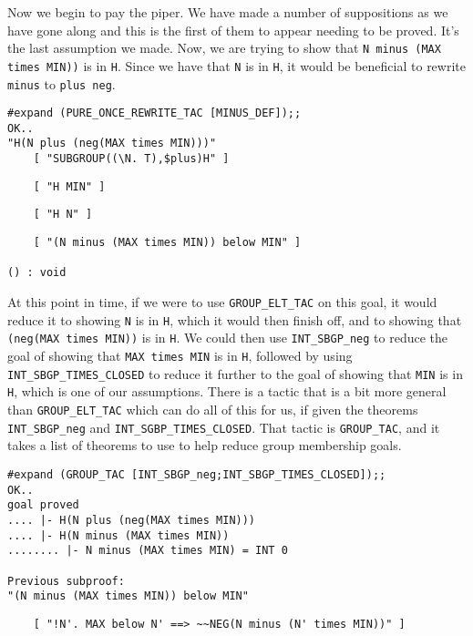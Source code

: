 Now we begin to pay the piper.  We have made a number of suppositions
as we have gone along and this is the first of them to appear needing
to be proved.  It's the last assumption we made.  Now, we are trying
to show that {\small\verb+N minus (MAX times MIN))+} is in {\small\tt H}.
Since we have that {\small\tt N} is in {\small\tt H}, it would be
beneficial to rewrite {\small\verb+minus+} to {\small\verb+plus neg+}.
\begin{session}
\begin{verbatim}
#expand (PURE_ONCE_REWRITE_TAC [MINUS_DEF]);;
OK..
"H(N plus (neg(MAX times MIN)))"
    [ "SUBGROUP((\N. T),$plus)H" ]
\end{verbatim}
\mvdots
\begin{verbatim}
    [ "H MIN" ]
\end{verbatim}
\mvdots
\begin{verbatim}
    [ "H N" ]
\end{verbatim}
\mvdots
\begin{verbatim}
    [ "(N minus (MAX times MIN)) below MIN" ]

() : void
\end{verbatim}
\end{session}

At this point in time, if we were to use {\small\verb+GROUP_ELT_TAC+}
on this goal, it would reduce it to showing {\small\tt N} is in
{\small\tt H}, which it would then finish off, and to showing that
{\small\verb+(neg(MAX times MIN))+} is in {\small\tt H}.  We could
then use {\small\verb+INT_SBGP_neg+} to reduce the goal of showing
that {\small\verb+MAX times MIN+} is in {\small\tt H}, followed by
using {\small\verb+INT_SBGP_TIMES_CLOSED+} to reduce it further to the
goal of showing that {\small\verb+MIN+} is in {\small\tt H}, which is
one of our assumptions.  There is a tactic that is a bit more general
than {\small\verb+GROUP_ELT_TAC+} which can do all of this for us, if
given the theorems {\small\verb+INT_SBGP_neg+} and
{\small\verb+INT_SGBP_TIMES_CLOSED+}.  That tactic is
{\small\verb+GROUP_TAC+}, and it takes a list of theorems to use to
help reduce group membership goals. 
\begin{session}
\begin{verbatim}
#expand (GROUP_TAC [INT_SBGP_neg;INT_SBGP_TIMES_CLOSED]);;
OK..
goal proved
.... |- H(N plus (neg(MAX times MIN)))
.... |- H(N minus (MAX times MIN))
........ |- N minus (MAX times MIN) = INT 0

Previous subproof:
"(N minus (MAX times MIN)) below MIN"
\end{verbatim}
\mvdots
\begin{verbatim}
    [ "!N'. MAX below N' ==> ~~NEG(N minus (N' times MIN))" ]
\end{verbatim}
\evdots
\end{session}

